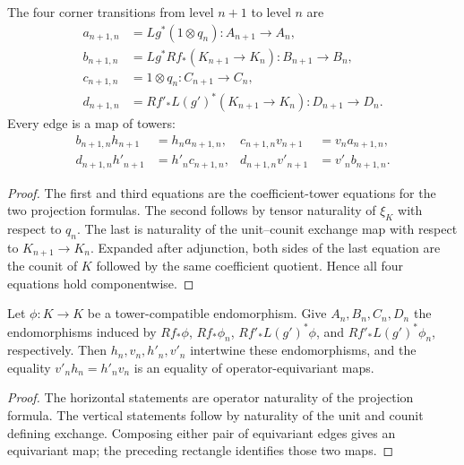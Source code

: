 \begin{lemma}
\label{lemma:weil-pbc-level-map-tower-compatibility}
The four corner transitions from level $n+1$ to level $n$ are
\[
\begin{aligned}
 a_{n+1,n}&=Lg^*(1\otimes q_n):A_{n+1}\to A_n,\\
 b_{n+1,n}&=Lg^*Rf_*(K_{n+1}\to K_n):B_{n+1}\to B_n,\\
 c_{n+1,n}&=1\otimes q_n:C_{n+1}\to C_n,\\
 d_{n+1,n}&=Rf'_*L(g')^*(K_{n+1}\to K_n):D_{n+1}\to D_n.
\end{aligned}
\]
Every edge is a map of towers:
\[
\begin{aligned}
 b_{n+1,n}h_{n+1}&=h_na_{n+1,n},&
 c_{n+1,n}v_{n+1}&=v_na_{n+1,n},\\
 d_{n+1,n}h'_{n+1}&=h'_nc_{n+1,n},&
 d_{n+1,n}v'_{n+1}&=v'_nb_{n+1,n}.
\end{aligned}
\]
\end{lemma}
\begin{proof}

The first and third equations are the coefficient-tower equations for the
two projection formulas.  The second follows by tensor naturality of
$\xi_K$ with respect to $q_n$.  The last is naturality of the unit--counit
exchange map with respect to $K_{n+1}\to K_n$.  Expanded after adjunction,
both sides of the last equation are the counit of $K$ followed by the same
coefficient quotient.  Hence all four equations hold componentwise.
\end{proof}

\begin{lemma}
\label{lemma:weil-pbc-level-map-operator-naturality}
Let $\phi:K\to K$ be a tower-compatible endomorphism.  Give
$A_n,B_n,C_n,D_n$ the endomorphisms induced by
$Rf_*\phi$, $Rf_*\phi_n$, $Rf'_*L(g')^*\phi$, and
$Rf'_*L(g')^*\phi_n$, respectively.  Then $h_n,v_n,h'_n,v'_n$ intertwine
these endomorphisms, and the equality $v'_nh_n=h'_nv_n$ is an equality of
operator-equivariant maps.
\end{lemma}
\begin{proof}

The horizontal statements are operator naturality of the projection
formula.  The vertical statements follow by naturality of the unit and
counit defining exchange.  Composing either pair of equivariant edges gives
an equivariant map; the preceding rectangle identifies those two maps.
\end{proof}

